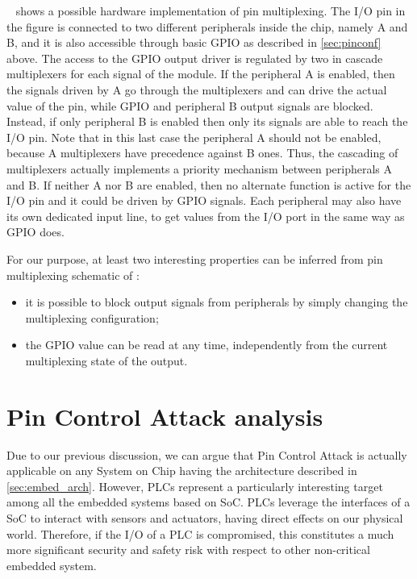 \myfig{\ref{fig:pinmux}}~ shows a possible hardware implementation of pin multiplexing.
The I/O pin in the figure is connected to two different peripherals inside the chip, namely A and B,
and it is also accessible through basic GPIO as described in \sec \ref{sec:pinconf} above.
The access to the GPIO output driver is regulated by two in cascade multiplexers for each signal of the module.
If the peripheral A is enabled, then the signals driven by A go through the multiplexers and can drive the actual value of the pin,
while GPIO and peripheral B output signals are blocked. Instead, if only peripheral B is enabled then only its signals are able to reach the I/O pin.
Note that in this last case the peripheral A should not be enabled, because A multiplexers have precedence against B ones.
Thus, the cascading of multiplexers actually implements a priority mechanism between peripherals A and B.
If neither A nor B are enabled, then no alternate function is active for the I/O pin and it could be driven by GPIO signals.
Each peripheral may also have its own dedicated input line, to get values from the I/O port in the same way as GPIO does.

For our purpose, at least two interesting properties can be inferred from pin multiplexing schematic of \myfig{\ref{fig:pinmux}}:
\begin{itemize}
	\item it is possible to block output signals from peripherals by simply changing the multiplexing configuration;
	\item the GPIO value can be read at any time, independently from the current multiplexing state of the output.
\end{itemize}


\section{Pin Control Attack analysis}

Due to our previous discussion, we can argue that Pin Control Attack is actually applicable on any System on Chip having the
architecture described in \sec \ref{sec:embed_arch}. However, PLCs represent a particularly interesting target among all the embedded systems
based on SoC. PLCs leverage the interfaces of a SoC to interact with sensors and actuators, having direct effects on our physical world.
Therefore, if the I/O of a PLC is compromised, this constitutes a much more significant security and safety risk with respect to other
non-critical embedded system.

